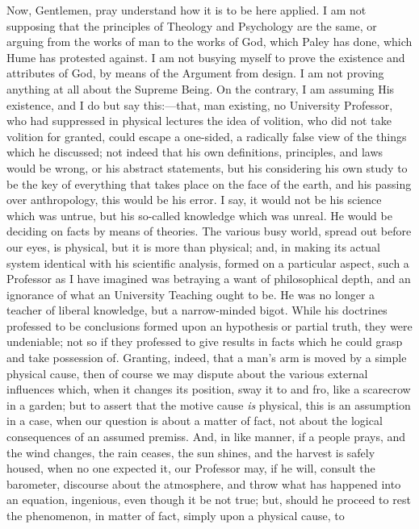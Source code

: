 Now, Gentlemen, pray understand how it is to be here applied. I am
not supposing that the principles of Theology and Psychology are
the same, or arguing from the works of man to the works of God, which
Paley has done, which Hume has protested against. I am not busying
myself to prove the existence and attributes of God, by means of the
Argument from design. I am not proving anything at all about the
Supreme Being. On the contrary, I am assuming His existence, and I do
but say this:—that, man existing, no University Professor, who had
suppressed in physical lectures the idea of volition, who did not take
volition for granted, could escape a one-sided, a radically false view
of the things which he discussed; not indeed that his own definitions,
principles, and laws would be wrong, or his abstract statements, but
his considering his own study to be the key of everything that takes
place on the face of the earth, and his passing over anthropology,
this would be his error. I say, it would not be his science which was
untrue, but his so-called knowledge which was unreal. He would be
deciding on facts by means of theories. The various busy world, spread
out before our eyes, is physical, but it is more than physical; and,
in making its actual system identical with his scientific analysis,
formed on a particular aspect, such a Professor as I have imagined was
betraying a want of philosophical depth, and an ignorance of what an
University Teaching ought to be. He was no longer a teacher of liberal
knowledge, but a narrow-minded bigot. While his doctrines professed to
be conclusions formed upon an hypothesis or partial truth, they were
undeniable; not so if they professed to give results in facts which he
could grasp and take possession of. Granting, indeed, that a man's arm
is moved by a simple physical cause, then of course we may dispute
about the various external influences which, when it changes its
position, sway it to and fro, like a scarecrow in a garden; but
to assert that the motive cause \emph{is} physical, this is an
assumption in a case, when our question is about a matter of fact, not
about the logical consequences of an assumed premiss. And, in like
manner, if a people prays, and the wind changes, the rain ceases, the
sun shines, and the harvest is safely housed, when no one expected it,
our Professor may, if he will, consult the barometer, discourse about
the atmosphere, and throw what has happened into an equation,
ingenious, even though it be not true; but, should he proceed to rest
the phenomenon, in matter of fact, simply upon a physical cause, to

